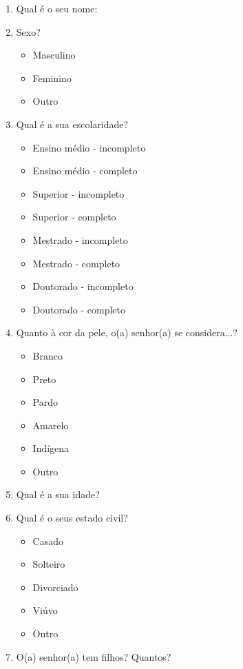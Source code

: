 \documentclass[a4paper, 12pt, openright, oneside, german, french, english, brazil]{abntex2}
\begin{document}
	\begin{enumerate}
		\item Qual é o seu nome: 
		
		\item Sexo?
		\begin{itemize}
			\item Masculino
			\item Feminino
			\item Outro
		\end{itemize}
		
		\item Qual é a sua escolaridade?
		\begin{itemize}
			\item Ensino médio - incompleto
			\item Ensino médio - completo
			\item Superior - incompleto
			\item Superior - completo
			\item Mestrado - incompleto
			\item Mestrado - completo
			\item Doutorado - incompleto
			\item Doutorado - completo
		\end{itemize}
		
		\item Quanto à cor da pele, o(a) senhor(a) se considera...?
		\begin{itemize}
			\item Branco
			\item Preto
			\item Pardo
			\item Amarelo
			\item Indígena
			\item Outro
		\end{itemize}
		
		\item Qual é a sua idade?
		

		\item Qual é o seus estado civil?
		\begin{itemize}
			\item Casado
			\item Solteiro
			\item Divorciado
			\item Viúvo
			\item Outro
		\end{itemize}
		
		
		\item O(a) senhor(a) tem filhos? Quantos?
		

\end{enumerate}
\end{document}
